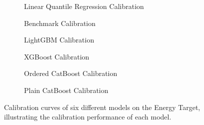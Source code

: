 \begin{figure}[htbp]
    \centering
    \begin{subfigure}[b]{0.5\textwidth}
        \centering
        
        \caption{Linear Quantile Regression Calibration}
        \label{fig:small-orfe-calibration-energy}
    \end{subfigure}%
    \begin{subfigure}[b]{0.5\textwidth}
        \centering
        
        \caption{Benchmark Calibration}
        \label{fig:armed-play-calibration-energy}
    \end{subfigure}
    
    \begin{subfigure}[b]{0.5\textwidth}
        \centering
        
        \caption{LightGBM Calibration}
        \label{fig:mangy-flux-calibration-energy}
    \end{subfigure}%
    \begin{subfigure}[b]{0.5\textwidth}
        \centering
        
        \caption{XGBoost Calibration}
        \label{fig:couth-ruby-calibration-energy}
    \end{subfigure}
    
    \begin{subfigure}[b]{0.5\textwidth}
        \centering
        
        \caption{Ordered CatBoost Calibration}
        \label{fig:civil-leas-calibration-energy}
    \end{subfigure}%
    \begin{subfigure}[b]{0.5\textwidth}
        \centering
        
        \caption{Plain CatBoost Calibration}
        \label{fig:blear-dita-calibration-energy}
    \end{subfigure}
    
    \caption{Calibration curves of six different models on the Energy Target, illustrating the calibration performance of each model.}
    \label{fig:energy_calibration}
\end{figure}

